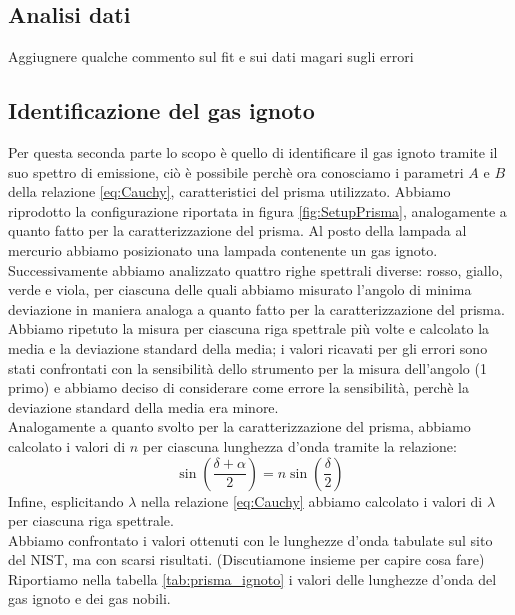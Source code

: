 \documentclass[letterpaper,12pt]{article}
\begin{document}
\subsection{Analisi dati}

Aggiugnere qualche commento sul fit e sui dati magari sugli errori


\subsection{Identificazione del gas ignoto}
Per questa seconda parte lo scopo è quello di identificare il gas ignoto tramite il suo spettro di emissione, ciò è possibile 
perchè ora conosciamo  i parametri $A$ e $B$ della relazione \ref{eq:Cauchy}, caratteristici del prisma utilizzato.
Abbiamo riprodotto la configurazione riportata in figura \ref{fig:SetupPrisma}, analogamente a quanto fatto per la 
caratterizzazione del prisma. Al posto della lampada al mercurio abbiamo posizionato una lampada contenente un gas
ignoto.
Successivamente abbiamo analizzato quattro righe spettrali diverse: rosso, giallo, verde e viola, per ciascuna delle quali abbiamo
misurato l'angolo di minima deviazione in maniera analoga a quanto fatto per la caratterizzazione del prisma. Abbiamo 
ripetuto la misura per ciascuna riga spettrale più volte e calcolato la media e la deviazione standard della media; i
valori ricavati per gli errori sono stati confrontati con la sensibilità dello strumento per la misura dell'angolo (1 primo) e abbiamo deciso di
considerare come errore la sensibilità, perchè la deviazione standard della media era minore. \\
Analogamente a quanto svolto per la caratterizzazione del prisma, abbiamo calcolato i valori di $n$ per ciascuna
lunghezza d'onda tramite la relazione: $$\sin(\frac{\delta + \alpha}{2}) = n \sin(\frac{\delta}{2})$$Infine, esplicitando
$\lambda$ nella relazione \ref{eq:Cauchy} abbiamo calcolato i valori di $\lambda$ per ciascuna riga spettrale. \\
Abbiamo confrontato i valori ottenuti con le lunghezze d'onda tabulate sul sito del NIST, ma con scarsi risultati.
(Discutiamone insieme per capire cosa fare)
Riportiamo nella tabella \ref{tab:prisma_ignoto} i valori delle lunghezze d'onda del gas ignoto e dei gas nobili.
\end{document}
